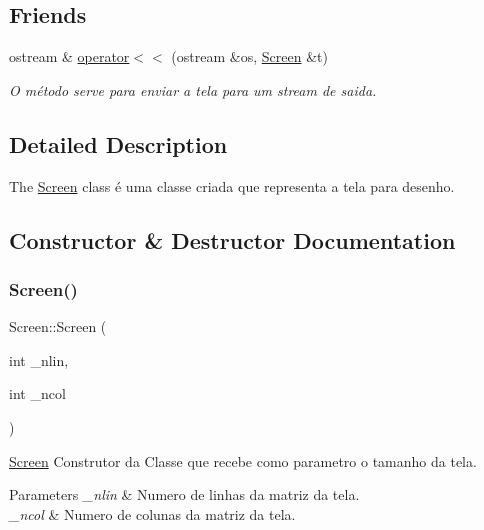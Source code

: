 \subsection*{Friends}
\begin{DoxyCompactItemize}
\item 
ostream \& \hyperlink{class_screen_aab6a2880746bfe1b7964817cc8f0989e}{operator$<$$<$} (ostream \&os, \hyperlink{class_screen}{Screen} \&t)
\begin{DoxyCompactList}\small\item\em O método serve para enviar a tela para um stream de saida. \end{DoxyCompactList}\end{DoxyCompactItemize}


\subsection{Detailed Description}
The \hyperlink{class_screen}{Screen} class é uma classe criada que representa a tela para desenho. 

\subsection{Constructor \& Destructor Documentation}
\mbox{\label{class_screen_a6c21beca43d25854d8674445127ef2eb}} 
\subsubsection{\texorpdfstring{Screen()}{Screen()}\hspace{0.1cm}{\footnotesize\ttfamily [1/2]}}
{\footnotesize\ttfamily Screen\+::\+Screen (\begin{DoxyParamCaption}\item[{int}]{\+\_\+nlin,  }\item[{int}]{\+\_\+ncol }\end{DoxyParamCaption})}



\hyperlink{class_screen}{Screen} Construtor da Classe que recebe como parametro o tamanho da tela. 


\begin{DoxyParams}{Parameters}
{\em \+\_\+nlin} & Numero de linhas da matriz da tela. \\
\hline
{\em \+\_\+ncol} & Numero de colunas da matriz da tela. \\
\hline
\end{DoxyParams}
\mbox{\label{class_screen_ae7576476fc6e6a6eaa66389fdc41fe72}} 

